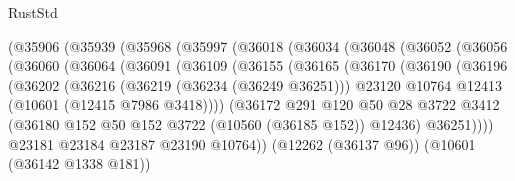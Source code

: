 \begin{lexlean}{RustStd}
\begin{coremodule}
                  (@35906
                    (@35939
                      (@35968
                        (@35997
                          (@36018
                            (@36034
                              (@36048
                                (@36052
                                  (@36056
                                    (@36060
                                      (@36064
                                        (@36091
                                          (@36109
                                            (@36155
                                              (@36165
                                                (@36170
                                                  (@36190
                                                    (@36196
                                                      (@36202
                                                        (@36216
                                                          (@36219 (@36234 (@36249 @36251)))
                                                          @23120
                                                          @10764
                                                          @12413
                                                          (@10601 (@12415 @7986 @3418))))
                                                      (@36172
                                                        @291
                                                        @120
                                                        @50
                                                        @28
                                                        @3722
                                                        @3412
                                                        (@36180
                                                          @152
                                                          @50
                                                          @152
                                                          @3722
                                                          (@10560 (@36185 @152))
                                                          @12436)
                                                        @36251))))
                                                @23181
                                                @23184
                                                @23187
                                                @23190
                                                @10764))
                                            (@12262 (@36137 @96))
                                            (@10601 (@36142 @1338 @181))

\end{coremodule}
\end{lexlean}
